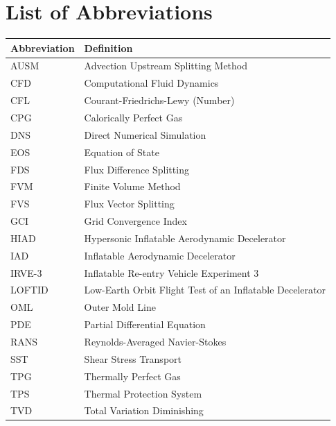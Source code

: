 \clearpage
\chapter*{List of Abbreviations}

\begin{longtable}{ll} %
\textbf{Abbreviation} & \textbf{Definition} \\
\endhead %

AUSM    & Advection Upstream Splitting Method \\
CFD     & Computational Fluid Dynamics \\
CFL     & Courant-Friedrichs-Lewy (Number) \\
CPG     & Calorically Perfect Gas \\
DNS     & Direct Numerical Simulation \\
EOS     & Equation of State \\
FDS     & Flux Difference Splitting \\
FVM     & Finite Volume Method \\
FVS     & Flux Vector Splitting \\
GCI     & Grid Convergence Index \\
HIAD    & Hypersonic Inflatable Aerodynamic Decelerator \\
IAD     & Inflatable Aerodynamic Decelerator \\
IRVE-3  & Inflatable Re-entry Vehicle Experiment 3 \\
LOFTID  & Low-Earth Orbit Flight Test of an Inflatable Decelerator \\
OML     & Outer Mold Line \\
PDE     & Partial Differential Equation \\
RANS    & Reynolds-Averaged Navier-Stokes \\
SST     & Shear Stress Transport \\
TPG     & Thermally Perfect Gas \\
TPS     & Thermal Protection System \\
TVD     & Total Variation Diminishing \\
\end{longtable}